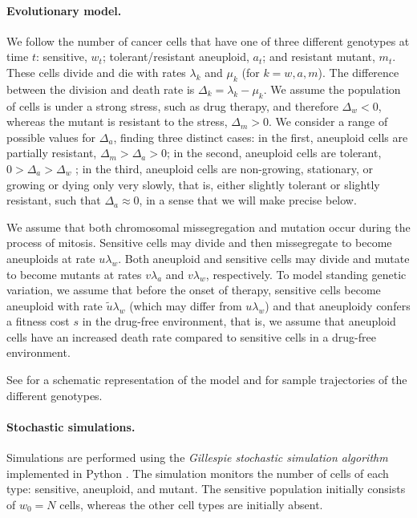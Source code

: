 \documentclass[12pt]{extarticle}
\begin{document}
\paragraph{Evolutionary model.}
We follow the number of cancer cells that have one of three different genotypes at time $t$: sensitive, $w_t$; tolerant/resistant aneuploid, $a_t$; and resistant mutant, $m_t$. 
These cells divide and die with rates $\lambda_k$ and $\mu_k$ (for $k=w, a, m$).
The difference between the division and death rate is $\Delta_k = \lambda_k-\mu_k$.
We assume the population of cells is under a strong stress, such as drug therapy, and therefore $\Delta_w<0$, whereas the mutant is resistant to the stress, $\Delta_m>0$.
We consider a range of possible values for $\Delta_a$, finding three distinct cases: in the first, aneuploid cells are partially resistant, $\Delta_m>\Delta_a>0$; in the second, aneuploid cells are tolerant, $0>\Delta_a>\Delta_w$ \citep[see][for the distinction between susceptible, resistant, and tolerant]{brauner2016distinguishing}; in the third, aneuploid cells are non-growing, stationary, or growing or dying only very slowly, that is, either slightly tolerant or slightly resistant, such that $\Delta_a \approx 0$, in a sense that we will make precise below. 

We assume that both chromosomal missegregation and mutation occur during the process of mitosis. 
Sensitive cells may divide and then missegregate to become aneuploids at rate $u\lambda_w$. Both aneuploid and sensitive cells may divide and mutate to become mutants at rates $v\lambda_{a}$ and $v\lambda_{w}$, respectively.
To model standing genetic variation, we assume that before the onset of therapy, sensitive cells become aneuploid with rate $\tilde{u}\lambda_w$ (which may differ from $u \lambda_w$) and that aneuploidy confers a fitness cost $s$ in the drug-free environment, that is, we assume that aneuploid cells have an increased death rate compared to sensitive cells in a drug-free environment.

See  for a schematic representation of the model and  for sample trajectories of the different genotypes. 


\paragraph{Stochastic simulations.} 
Simulations are performed using the \emph{Gillespie stochastic simulation algorithm} \citep{gillespie1976general,gillespie1977exact} implemented in Python \citep{python}.
The simulation monitors the number of cells of each type: sensitive, aneuploid, and mutant. 
The sensitive population initially consists of $w_0=N$ cells, whereas the other cell types are initially absent.
\end{document}
